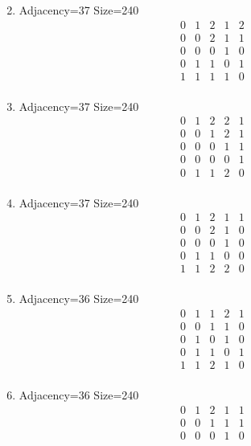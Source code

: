 \documentclass[12pt]{article}
\begin{document}
\begin{multicols}{3}
\begin{enumerate}
\begin{equation*}
\end{equation*}
\item Adjacency=37 Size=240
\begin{equation*}
\begin{array}{ccccc}
0&1&2&1&2\\
0&0&2&1&1\\
0&0&0&1&0\\
0&1&1&0&1\\
1&1&1&1&0\\
\end{array}
\end{equation*}
\item Adjacency=37 Size=240
\begin{equation*}
\begin{array}{ccccc}
0&1&2&2&1\\
0&0&1&2&1\\
0&0&0&1&1\\
0&0&0&0&1\\
0&1&1&2&0\\
\end{array}
\end{equation*}
\item Adjacency=37 Size=240
\begin{equation*}
\begin{array}{ccccc}
0&1&2&1&1\\
0&0&2&1&0\\
0&0&0&1&0\\
0&1&1&0&0\\
1&1&2&2&0\\
\end{array}
\end{equation*}
\item Adjacency=36 Size=240
\begin{equation*}
\begin{array}{ccccc}
0&1&1&2&1\\
0&0&1&1&0\\
0&1&0&1&0\\
0&1&1&0&1\\
1&1&2&1&0\\
\end{array}
\end{equation*}
\item Adjacency=36 Size=240
\begin{equation*}
\begin{array}{ccccc}
0&1&2&1&1\\
0&0&1&1&1\\
0&0&0&1&0\\

\end{array}
\end{equation*}
\end{enumerate}
\end{multicols}
\end{document}
